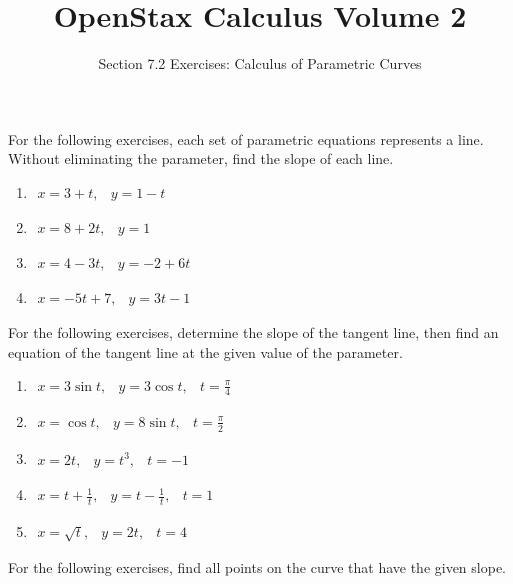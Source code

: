 \documentclass{exercises}
\title{OpenStax Calculus Volume 2}
\subtitle{Section 7.2 Exercises: Calculus of Parametric Curves}
\author{}
\date{}
\begin{document}
\maketitle


For the following exercises, each set of parametric equations represents a line. Without eliminating the parameter, find the slope of each line.

\begin{enumerate}[start=1]
\item $\begin{matrix}x=3+t, & y=1-t\end{matrix}$
\item $\begin{matrix}x=8+2t, & y=1\end{matrix}$
\item $\begin{matrix}x=4-3t, & y=-2+6t\end{matrix}$
\item $\begin{matrix}x=-5t+7, & y=3t-1\end{matrix}$
\end{enumerate}

For the following exercises, determine the slope of the tangent line, then find an equation of the tangent line at the given value of the parameter.

\begin{enumerate}[resume]
\item $\begin{matrix}x=3\sin t, & y=3\cos t, & t=\frac{\pi}{4}\end{matrix}$
\item $\begin{matrix}x=\cos t, & y=8\sin t, & t=\frac{\pi}{2}\end{matrix}$
\item $\begin{matrix}x=2t, & y=t^{3}, & t=-1\end{matrix}$
\item $\begin{matrix}x=t+\frac{1}{t}, & y=t-\frac{1}{t}, & t=1\end{matrix}$
\item $\begin{matrix}x=\sqrt{t}, & y=2t, & t=4\end{matrix}$
\end{enumerate}

For the following exercises, find all points on the curve that have the given slope.
\end{document}
